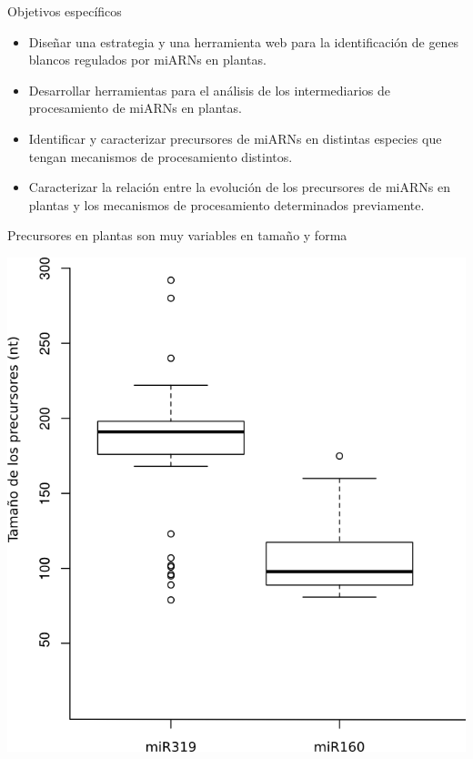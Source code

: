 \documentclass{beamer}
\begin{document}
\begin{frame}{Objetivos específicos}
		\pause
		\begin{itemize}
            \item<-1> Diseñar una estrategia y una herramienta web para la identificación de genes blancos regulados por miARNs en plantas.
			\item<-2> Desarrollar herramientas para el análisis de los intermediarios de procesamiento de miARNs en plantas.
			\item<-2> Identificar y caracterizar precursores de miARNs en distintas especies que tengan mecanismos de procesamiento distintos.
			\item<-1> Caracterizar la relación entre la evolución de los precursores de miARNs en plantas y los mecanismos de procesamiento determinados previamente.
        \end{itemize}
\end{frame}


\begin{frame}{Precursores en plantas son muy variables en tamaño y forma}
	\begin{center}
		\includegraphics[width=.5\textwidth]{img/hairpin_distribution.png}
	\end{center}
\end{frame}
\end{document}
